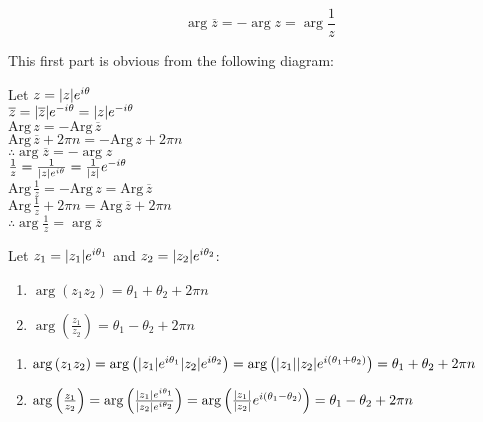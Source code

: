 \documentclass[letterpaper,12pt,fleqn]{article}
\renewcommand{\o}{\theta}
\newcommand{\Arg}[1]{\mathrm{Arg}\,#1}
\newcommand{\conj}[1]{\overline{#1}}
\begin{document}
\begin{theorem}
\[\arg{\conj{z}}=-\arg{z}=\arg{\frac{1}{z}}\]
\end{theorem}

This first part is obvious from the following diagram:

\begin{figure}[h]
\setlength{\leftskip}{0.5in}
\end{figure}

\begin{theproof}
Let $z=\abs{z}e^{i\o}$ \\
$\conj{z}=\abs{\conj{z}}e^{-i\o}=\abs{z}e^{-i\o}$ \\
$\Arg{z}=-\Arg{\conj{z}}$ \\
$\Arg{\conj{z}}+2\pi n=-\Arg{z}+2\pi n$ \\
$\therefore \arg{\conj{z}}=-\arg{z}$ \\

$\frac{1}{z}=\frac{1}{\abs{z}e^{i\o}}=\frac{1}{\abs{z}}e^{-i\o}$ \\
$\Arg{\frac{1}{z}}=-\Arg{z}=\Arg{\conj{z}}$ \\
$\Arg{\frac{1}{z}}+2\pi n=\Arg{\conj{z}}+2\pi n$ \\
$\therefore \arg{\frac{1}{z}}=\arg{\conj{z}}$ \\
\end{theproof}

\begin{theorem}
Let $z_1=\abs{z_1}e^{i\o_1}$ and $z_2=\abs{z_2}e^{i\o_2}$:
\begin{enumerate}
\item $\arg{(z_1z_2)}=\o_1+\o_2+2\pi n$
\item $\arg{\left(\frac{z_1}{z_2}\right)}=\o_1-\o_2+2\pi n$
\end{enumerate}
\end{theorem}

\begin{theproof}
\listbreak
\begin{enumerate}
\item $\arg{(z_1z_2)}=\arg{\left(\abs{z_1}e^{i\o_1}\abs{z_2}e^{i\o_2}\right)}=
    \arg{\left(\abs{z_1}\abs{z_2}e^{i(\o_1+\o_2)}\right)}=
    \o_1+\o_2+2\pi n$

\item $\arg{\left(\frac{z_1}{z_2}\right)}=
    \arg{\left(\frac{\abs{z_1}e^{i\o_1}}{\abs{z_2}e^{i\o_2}}\right)}=
    \arg{\left(\frac{\abs{z_1}}{\abs{z_2}}e^{i(\o_1-\o_2)}\right)}=
    \o_1-\o_2+2\pi n$
\end{enumerate}
\end{theproof}
\end{document}
